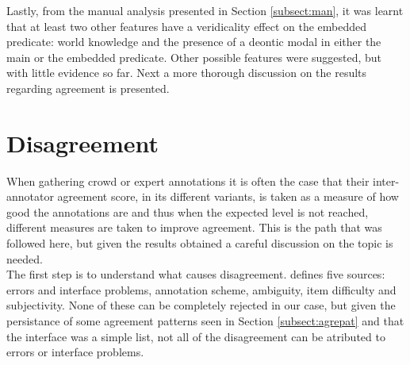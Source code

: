 Lastly, from the manual analysis presented in Section \ref{subsect:man}, it was learnt that at least two other features have a veridicality effect on the embedded predicate: world knowledge and the presence of a deontic modal in either the main or the embedded predicate. Other possible features were suggested, but with little evidence so far. Next a more thorough discussion on the results regarding agreement is presented.\\

\section{Disagreement}\label{sect:dis}
When gathering crowd or expert annotations it is often the case that their inter-annotator agreement score, in its different variants, is taken as a measure of how good the annotations are and thus when the expected level is not reached, different measures are taken to improve agreement. This is the path that was followed here, but given the results obtained a careful discussion on the topic is needed.\\

The first step is to understand what causes disagreement. \citet{uma2021learning} defines five sources: errors and interface problems, annotation scheme, ambiguity, item difficulty and subjectivity. None of these can be completely rejected in our case, but given the persistance of some agreement patterns seen in Section \ref{subsect:agrepat} and that the interface was a simple list, not all of the disagreement can be atributed to errors or interface problems.\\ 

